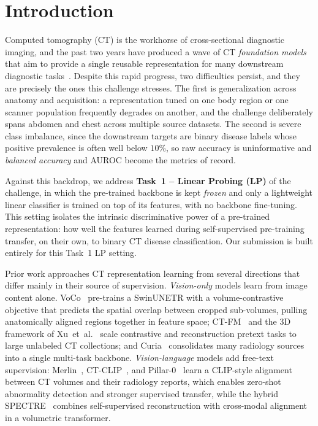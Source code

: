 \documentclass[runningheads]{llncs}
\begin{document}
\section{Introduction}

Computed tomography (CT) is the workhorse of cross-sectional diagnostic imaging,
and the past two years have produced a wave of CT \emph{foundation models} that
aim to provide a single reusable representation for many downstream diagnostic
tasks~\cite{voco,ctfm,merlin,ctclip,pillar0}. Despite this rapid progress, two
difficulties persist, and they are precisely the ones this challenge stresses.
The first is generalization across anatomy and acquisition: a representation
tuned on one body region or one scanner population frequently degrades on
another, and the challenge deliberately spans abdomen and chest across multiple
source datasets. The second is severe class imbalance, since the downstream
targets are binary disease labels whose positive prevalence is often well below
$10\%$, so raw accuracy is uninformative and \emph{balanced accuracy} and AUROC
become the metrics of record.

Against this backdrop, we address \textbf{Task~1 -- Linear Probing (LP)} of the
challenge, in which the pre-trained backbone is kept \emph{frozen} and only a
lightweight linear classifier is trained on top of its features, with no
backbone fine-tuning. This setting isolates the intrinsic discriminative power
of a pre-trained representation: how well the features learned during
self-supervised pre-training transfer, on their own, to binary CT disease
classification. Our submission is built entirely for this Task~1 LP setting.

Prior work approaches CT representation learning from several directions that
differ mainly in their source of supervision. \emph{Vision-only} models learn
from image content alone. VoCo~\cite{voco} pre-trains a SwinUNETR with a
volume-contrastive objective that predicts the spatial overlap between cropped
sub-volumes, pulling anatomically aligned regions together in feature space;
CT-FM~\cite{ctfm} and the 3D framework of Xu~et~al.~\cite{ctfm_xu} scale
contrastive and reconstruction pretext tasks to large unlabeled CT collections;
and Curia~\cite{curia} consolidates many radiology sources into a single
multi-task backbone. \emph{Vision-language} models add free-text supervision:
Merlin~\cite{merlin}, CT-CLIP~\cite{ctclip}, and Pillar-0~\cite{pillar0} learn a
CLIP-style alignment between CT volumes and their radiology reports, which
enables zero-shot abnormality detection and stronger supervised transfer, while
the hybrid SPECTRE~\cite{SPECTRE} combines self-supervised reconstruction with
cross-modal alignment in a volumetric transformer.
\end{document}
